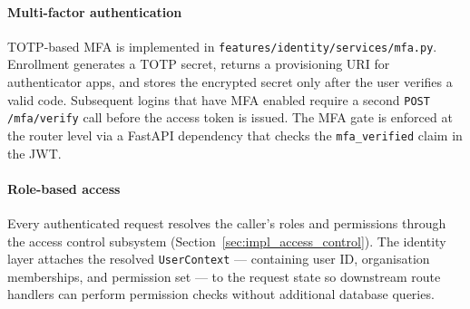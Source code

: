 \paragraph{Multi-factor authentication}
TOTP-based MFA is implemented in \texttt{features/identity/services/mfa.py}. Enrollment generates a TOTP secret, returns a provisioning URI for authenticator apps, and stores the encrypted secret only after the user verifies a valid code. Subsequent logins that have MFA enabled require a second \texttt{POST /mfa/verify} call before the access token is issued. The MFA gate is enforced at the router level via a FastAPI dependency that checks the \texttt{mfa\_verified} claim in the JWT.

\paragraph{Role-based access}
Every authenticated request resolves the caller's roles and permissions through the access control subsystem (Section~\ref{sec:impl_access_control}). The identity layer attaches the resolved \texttt{UserContext} — containing user ID, organisation memberships, and permission set — to the request state so downstream route handlers can perform permission checks without additional database queries.
